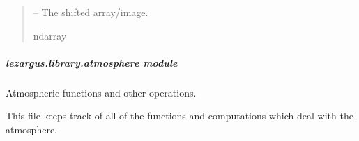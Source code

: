 \documentclass[letterpaper,11pt,english]{sphinxmanual}
\begin{document}
\begin{savenotes}
\begin{fulllineitems}
\begin{quote}
\begin{description}
\begin{itemize}
\end{itemize}

\sphinxAtStartPar
{} – The shifted array/image.

\sphinxAtStartPar
ndarray

\end{description}\end{quote}

\end{fulllineitems}\end{savenotes}


\sphinxstepscope


\subparagraph{lezargus.library.atmosphere module}
\label{\detokenize{code/lezargus.library.atmosphere:module-lezargus.library.atmosphere}}\label{\detokenize{code/lezargus.library.atmosphere:lezargus-library-atmosphere-module}}\label{\detokenize{code/lezargus.library.atmosphere::doc}}
\sphinxAtStartPar
Atmospheric functions and other operations.

\sphinxAtStartPar
This file keeps track of all of the functions and computations which deal
with the atmosphere.
\end{document}
